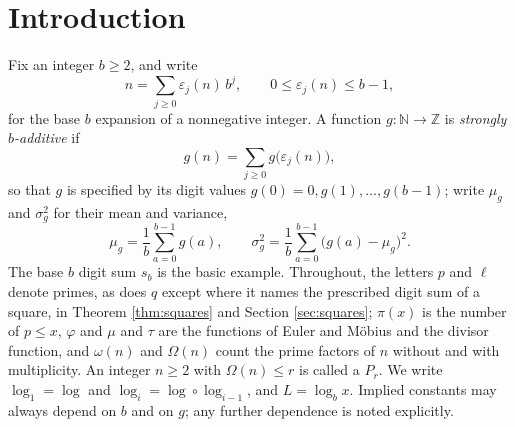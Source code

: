 \documentclass[11pt,reqno]{amsart}
\theoremstyle{plain}
\theoremstyle{definition}
\newcommand{\N}{\mathbb{N}}
\newcommand{\Z}{\mathbb{Z}}
\begin{document}
\section{Introduction}

Fix an integer $b\ge 2$, and write
\[
n=\sum_{j\ge 0}\varepsilon_j(n)\,b^{j},\qquad 0\le \varepsilon_j(n)\le b-1,
\]
for the base $b$ expansion of a nonnegative integer. A function $g\colon\N\to\Z$ is \emph{strongly $b$-additive} if
\[
g(n)=\sum_{j\ge 0}g\big(\varepsilon_j(n)\big),
\]
so that $g$ is specified by its digit values $g(0)=0,g(1),\dots,g(b-1)$; write $\mu_g$ and $\sigma_g^2$ for their mean and variance,
\[
\mu_g=\frac1b\sum_{a=0}^{b-1}g(a),\qquad
\sigma_g^2=\frac1b\sum_{a=0}^{b-1}\big(g(a)-\mu_g\big)^2 .
\]
The base $b$ digit sum $s_b$ is the basic example. Throughout, the letters $p$ and $\ell$ denote primes, as does $q$ except where it names the prescribed digit sum of a square, in Theorem \ref{thm:squares} and Section \ref{sec:squares}; $\pi(x)$ is the number of $p\le x$, $\varphi$ and $\mu$ and $\tau$ are the functions of Euler and M\"obius and the divisor function, and $\omega(n)$ and $\Omega(n)$ count the prime factors of $n$ without and with multiplicity. An integer $n\ge2$ with $\Omega(n)\le r$ is called a $P_r$. We write $\log_1=\log$ and $\log_{i}=\log\circ\log_{i-1}$, and $L=\log_bx$. Implied constants may always depend on $b$ and on $g$; any further dependence is noted explicitly.
\end{document}
